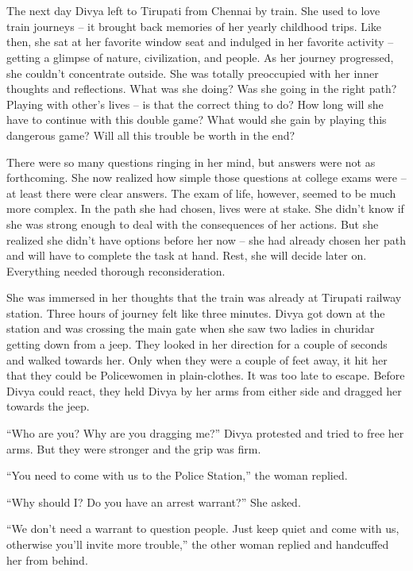 \chapter{}

The next day Divya left to Tirupati from Chennai by train. She used to love
train journeys – it brought back memories of her yearly childhood trips. Like
then, she sat at her favorite window seat and indulged in her favorite activity
– getting a glimpse of nature, civilization, and people. As her journey
progressed, she couldn't concentrate outside. She was totally preoccupied with
her inner thoughts and reflections. What was she doing? Was she going in the
right path? Playing with other's lives – is that the correct thing to do? How
long will she have to continue with this double game? What would she gain by
playing this dangerous game? Will all this trouble be worth in the end?

There were so many questions ringing in her mind, but answers were not as
forthcoming. She now realized how simple those questions at college exams were –
at least there were clear answers. The exam of life, however, seemed to be much
more complex. In the path she had chosen, lives were at stake. She didn't know
if she was strong enough to deal with the consequences of her actions. But she
realized she didn't have options before her now – she had already chosen her
path and will have to complete the task at hand. Rest, she will decide later on.
Everything needed thorough reconsideration.

She was immersed in her thoughts that the train was already at Tirupati railway
station. Three hours of journey felt like three minutes. Divya got down at the
station and was crossing the main gate when she saw two ladies in churidar
getting down from a jeep. They looked in her direction for a couple of seconds
and walked towards her. Only when they were a couple of feet away, it hit her
that they could be Policewomen in plain-clothes. It was too late to escape.
Before Divya could react, they held Divya by her arms from either side and
dragged her towards the jeep.

“Who are you? Why are you dragging me?” Divya protested and tried to free her
arms. But they were stronger and the grip was firm.

“You need to come with us to the Police Station,” the woman replied.

“Why should I? Do you have an arrest warrant?” She asked.

“We don't need a warrant to question people. Just keep quiet and come with us,
otherwise you'll invite more trouble,” the other woman replied and handcuffed
her from behind.

